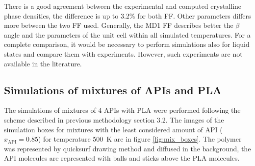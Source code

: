 \newpage
There is a good agreement between the experimental and computed crystalline phase densities, the difference is up to 3.2\% for both FF. Other parameters differs more between the two FF used. Generally, the MD1 FF describes better the $\beta$ angle and the parameters of the unit cell within all simulated temperatures. For a complete comparison, it would be necessary to perform simulations also for liquid states and compare them with experiments. However, such experiments are not available in the literature.

\vspace{-0.2cm}
\subsection{Simulations of mixtures of APIs and PLA}
\vspace{-0.2cm}
The simulations of mixtures of 4 APIs with PLA were performed following the scheme described in previous methodology section 3.2. The images of the simulation boxes for mixtures with the least considered amount of API ($x_{\text{API}}=0.85$) for temperature 500~K are in figure \ref{fig:mix_boxes}. The polymer was represented by quicksurf drawing method and diffused in the background, the API molecules are represented with balls and sticks above the PLA molecules.

